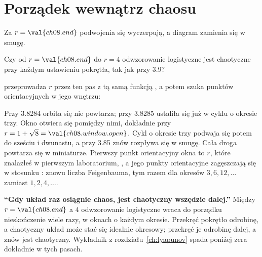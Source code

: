 \section{Porządek wewnątrz chaosu}
\label{sec:ch08-windows}

\noindent
Za $r = \val{ch08.end}$ podwojenia się wyczerpują, a diagram zamienia się w
smugę.

\begin{think}
Czy od $r = \val{ch08.end}$ do $r = 4$ odwzorowanie logistyczne jest
chaotyczne przy każdym ustawieniu pokrętła, tak jak przy \num{3.9}?
\end{think}
 przeprowadza $r$ przez ten pas z tą samą funkcją
, a potem szuka punktów orientacyjnych w jego
wnętrzu:


\noindent
Przy \num{3.8284} orbita się nie powtarza; przy \num{3.8285} ustaliła się
już w cyklu o okresie trzy. Okno otwiera się pomiędzy nimi, dokładnie przy
$r = 1 + \sqrt{8} = \val{ch08.window.open}$. Cykl o okresie trzy podwaja się
potem do sześciu i dwunastu, a przy \num{3.85} znów rozpływa się w smugę.
Cała droga powtarza się w miniaturze. Pierwszy punkt orientacyjny okna to
$r$, które znalazłeś w pierwszym laboratorium, , a jego
punkty orientacyjne zagęszczają się w stosunku :
znowu liczba Feigenbauma, tym razem dla okresów $3, 6, 12, \ldots$ zamiast
$1, 2, 4, \ldots$.


\begin{trapbox}
\textbf{\enquote{Gdy układ raz osiągnie chaos, jest chaotyczny wszędzie
dalej.}} Między $r = \val{ch08.end}$ a $4$ odwzorowanie logistyczne wraca do
porządku nieskończenie wiele razy, w oknach o każdym okresie. Przekręć
pokrętło odrobinę, a chaotyczny układ może stać się idealnie okresowy;
przekręć je odrobinę dalej, a znów jest chaotyczny. Wykładnik z
rozdziału~\ref{ch:lyapunov} spada poniżej zera dokładnie w tych pasach.
\end{trapbox}


